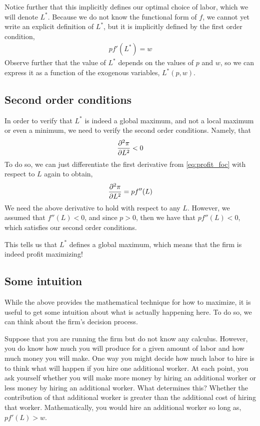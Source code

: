 Notice further that this implicitly defines our optimal choice of labor, which we will denote $L^*$. Because we do not know the functional form of $f$, we cannot yet write an explicit definition of $L^*$, but it is implicitly defined by the first order condition,
\begin{align}
    p f'(L^*) = w \label{eq:general_foc}
\end{align}
Observe further that the value of $L^*$ depends on the values of $p$ and $w$, so we can express it as a function of the exogenous variables, $L^*(p, w)$. 

\subsection*{Second order conditions}
In order to verify that $L^*$ is indeed a global maximum, and not a local maximum or even a minimum, we need to verify the second order conditions. Namely, that
\begin{align*}
    \frac{\partial ^2\pi}{\partial L^2} < 0
\end{align*}
To do so, we can just differentiate the first derivative from \ref{eq:profit_foc} with respect to $L$ again to obtain, 
\begin{align}
    \frac{\partial ^2\pi}{\partial L^2} = pf''(L) \label{eq:generalized_soc}
\end{align}
We need the above derivative to hold with respect to any $L$. However, we assumed that $f''(L) < 0$, and since $p > 0$, then we have that $pf''(L)< 0$, which satisfies our second order conditions.

This tells us that $L^*$ defines a global maximum, which means that the firm is indeed profit maximizing! 

\subsection*{Some intuition}
While the above provides the mathematical technique for how to maximize, it is useful to get some intuition about what is actually happening here. To do so, we can think about the firm's decision process.

Suppose that you are running the firm but do not know any calculus. However, you do know how much you will produce for a given amount of labor and how much money you will make. One way you might decide how much labor to hire is to think what will happen if you hire one additional worker. At each point, you ask yourself whether you will make more money by hiring an additional worker or less money by hiring an additional worker. What determines this? Whether the contribution of that additional worker is greater than the additional cost of hiring that worker. Mathematically, you would hire an additional worker so long as, $p f'(L) > w$. 

